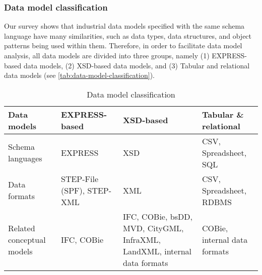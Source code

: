 \subsubsection{Data model classification}\label{sec:data-model-classification}

Our survey shows that industrial data models specified with the same schema language have many similarities, such as data types, data structures, and object patterns being used within them.
Therefore, in order to facilitate data model analysis, all data models are divided into three groups, namely (1) EXPRESS-based data models, (2) XSD-based data models, and (3) Tabular and relational data models (see \autoref{tab:data-model-classification}).


\begin{table}\footnotesize
    \centering
    \caption{Data model classification}
    
    
    
    \begin{tabulary}{\columnwidth}{p{0.2\columnwidth}p{0.2\columnwidth}p{0.2\columnwidth}p{0.2\columnwidth}}
        \hline
            Data models      &
            EXPRESS-based   &
            XSD-based       &
            Tabular \& \newline relational
        \\
        \hline
            Schema \newline languages &
            EXPRESS & XSD   &
            CSV, \newline Spreadsheet, \newline SQL
        \\
            Data formats &
            STEP-File (SPF),    \newline STEP-XML &
            XML &
            CSV, \newline   Spreadsheet,    \newline RDBMS
        \\            
            Related \newline conceptual \newline models   &
            IFC, \newline COBie &
            IFC, \newline COBie, \newline bsDD, \newline MVD, \newline CityGML, \newline InfraXML, \newline LandXML, \newline internal \newline data \newline formats &
            COBie, \newline internal \newline data \newline formats
        \\
        \hline
    \end{tabulary}
    \label{tab:data-model-classification}
\end{table}







